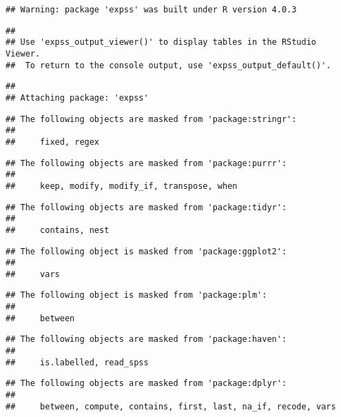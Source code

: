 \documentclass[
]{article}
\begin{document}
\begin{verbatim}
## Warning: package 'expss' was built under R version 4.0.3
\end{verbatim}

\begin{verbatim}
## 
## Use 'expss_output_viewer()' to display tables in the RStudio Viewer.
##  To return to the console output, use 'expss_output_default()'.
\end{verbatim}

\begin{verbatim}
## 
## Attaching package: 'expss'
\end{verbatim}

\begin{verbatim}
## The following objects are masked from 'package:stringr':
## 
##     fixed, regex
\end{verbatim}

\begin{verbatim}
## The following objects are masked from 'package:purrr':
## 
##     keep, modify, modify_if, transpose, when
\end{verbatim}

\begin{verbatim}
## The following objects are masked from 'package:tidyr':
## 
##     contains, nest
\end{verbatim}

\begin{verbatim}
## The following object is masked from 'package:ggplot2':
## 
##     vars
\end{verbatim}

\begin{verbatim}
## The following object is masked from 'package:plm':
## 
##     between
\end{verbatim}

\begin{verbatim}
## The following objects are masked from 'package:haven':
## 
##     is.labelled, read_spss
\end{verbatim}

\begin{verbatim}
## The following objects are masked from 'package:dplyr':
## 
##     between, compute, contains, first, last, na_if, recode, vars
\end{verbatim}
\end{document}
